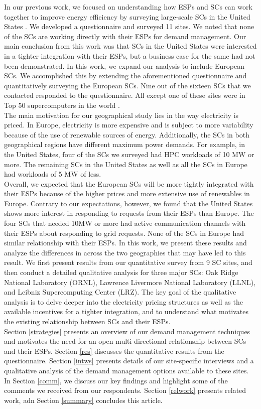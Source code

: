 In our previous work, we focused on understanding how ESPs and SCs can work together to improve energy efficiency by surveying large-scale SCs in the United States \cite{BatesESP}. We developed a questionnaire and surveyed 11 sites. We noted that none of the SCs are working directly with their ESPs for demand management. Our main conclusion from this work was that SCs in the United States were interested in a tighter integration with their ESPs, but a business case for the same had not been demonstrated. In this work, we expand our analysis to include European SCs. We accomplished this by extending the aforementioned questionnaire and quantitatively surveying the European SCs. Nine out of the sixteen SCs that we contacted responded to the questionnaire. All except one of these sites were in Top 50 supercomputers in the world \cite{Top500}. \\

The main motivation for our geographical study lies in the way electricity is priced. In Europe, electricity is more expensive and is subject to more variability because of the use of renewable sources of energy. Additionally, the SCs in both geographical regions have different maximum power demands. For example, in the United States, four of the SCs we surveyed had HPC workloads of 10 MW or more. The remaining SCs  in the United States as well as all the SCs in Europe had workloads of 5 MW of less. \\

Overall, we expected that the European SCs will be more tightly integrated with their ESPs because of the higher prices and more extensive use of renewables in Europe.  Contrary to our expectations, however, we found that the United States shows more interest in responding to requests from their ESPs than Europe. The four SCs that needed 10MW or more had active communication channels with their ESPs about responding to grid requests.  None of the SCs in Europe had similar relationship with their ESPs. In this work, we present these results and analyze the differences in across the two geographies that may have led to this result. We first present results from our quantitative survey from 9 SC sites, and then conduct a detailed qualitative analysis for three major SCs: Oak Ridge National Laboratory (ORNL), Lawrence Livermore National Laboratory (LLNL), and Leibniz Supercomputing Center (LRZ). The key goal of the qualitative analysis is to delve deeper into the electricity pricing structures as well as the available incentives for a tighter integration, and to understand what motivates the existing relationship between SCs and their ESPs. \\

Section \ref{strategies} presents an overview of our demand management techniques and motivates the need for an open multi-directional relationship between SCs and their ESPs. Section \ref{res} discusses the quantitative results from the questionnaire. Section \ref{intws} presents details of our site-specific interviews and a qualitative analysis of the demand management options available to these sites. In Section \ref{comm}, we discuss our key findings and highlight some of the comments we received from our respondents. Section \ref{relwork} presents related work, adn Section \ref{summary} concludes this article.
